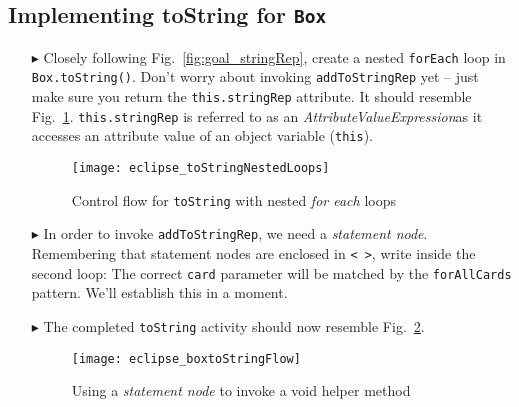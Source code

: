 \newpage
\hypertarget{stringRep tex}{}
\subsection{Implementing toString for \texttt{Box}}
\texHeader

\vspace{0.5cm}

\begin{itemize}
  
\item[$\blacktriangleright$] Closely following Fig.~\ref{fig:goal_stringRep}, create a nested \texttt{forEach} loop in \texttt{Box.toString()}.
Don't worry about invoking \texttt{addToStringRep} yet -- just make sure you return the \texttt{this.stringRep} attribute. It should resemble
Fig.~\ref{fig:emptyLoops}. \texttt{this.stringRep} is referred to as an \emph{AttributeValueExpression}as it accesses an
attribute value of an object variable (\texttt{this}).

\begin{figure}[htp]
\begin{center}
  \texttt{[image: eclipse\_toStringNestedLoops]}
  \caption{Control flow for \texttt{toString} with nested \emph{for each} loops}
  \label{fig:emptyLoops}
\end{center}
\end{figure}

\item[$\blacktriangleright$] In order to invoke \texttt{addToStringRep}, we need a \emph{statement node}. Remembering that statement nodes are enclosed in
\texttt{< >}, write inside the second loop:  
The correct \texttt{card} parameter will be matched by the \texttt{forAllCards} pattern. We'll establish this in a moment.

\vspace{0.5cm}

\item[$\blacktriangleright$] The completed \texttt{toString} activity should now resemble Fig.~\ref{fig:toStringFlow}.

\vspace{0.5cm}

\begin{figure}[htp]
\begin{center}
  \texttt{[image: eclipse\_boxtoStringFlow]}
  \caption{Using a \emph{statement node} to invoke a void helper method}
  \label{fig:toStringFlow}
\end{center}
\end{figure}


\end{itemize}
